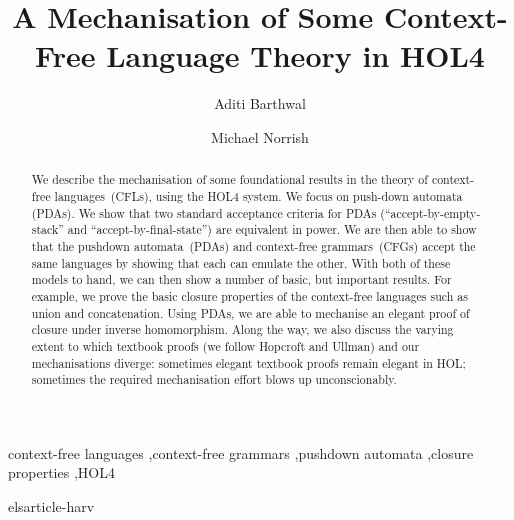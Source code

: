 \documentclass[1p,review,authoryear]{elsarticle}
\begin{document}
\begin{frontmatter}
\date{}

\title{A Mechanisation of Some Context-Free Language Theory in HOL4}

\author[ab]{Aditi Barthwal}
\author[mn]{ Michael Norrish}
\address[ab]{Australian National University}
\address[mn]{Canberra Research Lab., NICTA}



\begin{abstract}
We describe the mechanisation of some foundational results in the theory of context-free languages~(CFLs), using the HOL4 system.
We focus on push-down automata (PDAs).
We show that two standard acceptance criteria for PDAs (``accept-by-empty-stack'' and ``accept-by-final-state'') are equivalent in power.
We are then able to show that the pushdown automata~(PDAs) and context-free grammars~(CFGs) accept the same languages by showing that each can emulate the other.
With both of these models to hand, we can then show a number of basic, but important results.
For example, we prove the basic closure properties of the context-free languages such as union and concatenation.
Using PDAs, we are able to mechanise an elegant proof of closure under inverse homomorphism.
Along the way, we also discuss the varying extent to which textbook proofs (we follow Hopcroft and Ullman) and our mechanisations diverge: sometimes elegant textbook proofs remain elegant in HOL; sometimes the required mechanisation effort blows up unconscionably.
\end{abstract}

\begin{keyword}
context-free languages \sep context-free grammars \sep pushdown automata \sep closure properties \sep HOL4
\end{keyword}
\end{frontmatter}










 {elsarticle-harv}

\end{document}
